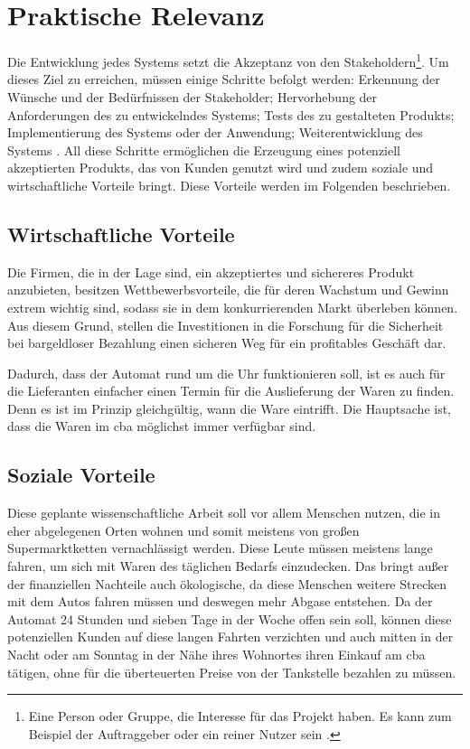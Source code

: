 \section{Praktische Relevanz}

Die Entwicklung jedes Systems setzt die Akzeptanz von den Stakeholdern\footnote{Eine Person oder Gruppe, die Interesse 
für das Projekt haben. Es kann zum Beispiel der Auftraggeber oder ein reiner Nutzer sein \cite{refip:HSSI}.}. Um dieses Ziel 
zu erreichen, müssen einige Schritte befolgt werden: Erkennung der Wünsche und der Bedürfnissen der Stakeholder; Hervorhebung 
der Anforderungen des zu entwickelndes Systems; Tests des zu gestalteten Produkts; Implementierung des Systems oder 
der Anwendung; Weiterentwicklung des Systems \cite{refbook:RECR}. All diese Schritte ermöglichen die Erzeugung eines 
potenziell akzeptierten Produkts, das von Kunden genutzt wird und zudem soziale und wirtschaftliche Vorteile bringt.
Diese Vorteile werden im Folgenden beschrieben.


\subsection{Wirtschaftliche Vorteile}

Die Firmen, die in der Lage sind, ein akzeptiertes und sichereres Produkt anzubieten, besitzen Wettbewerbsvorteile, 
die für deren Wachstum und Gewinn extrem wichtig sind, sodass sie in dem konkurrierenden Markt überleben können. Aus 
diesem Grund, stellen die Investitionen in die Forschung für die Sicherheit bei bargeldloser Bezahlung einen sicheren 
Weg für ein profitables Geschäft dar.


Dadurch, dass der Automat rund um die Uhr funktionieren soll, ist es auch für die Lieferanten einfacher einen Termin 
für die Auslieferung der Waren zu finden. Denn es ist im Prinzip gleichgültig, wann die Ware eintrifft. Die Hauptsache 
ist, dass die Waren im \acrshort{cba} möglichst immer verfügbar sind. 


\subsection{Soziale Vorteile}

Diese geplante wissenschaftliche Arbeit soll vor allem Menschen nutzen, die in eher abgelegenen Orten wohnen und somit 
meistens von großen Supermarktketten vernachlässigt werden. Diese Leute müssen meistens lange fahren, um sich mit
Waren des täglichen Bedarfs einzudecken. Das bringt außer der finanziellen Nachteile auch ökologische, da diese Menschen 
weitere Strecken mit dem Autos fahren müssen und deswegen mehr Abgase entstehen. Da der Automat 24 Stunden und sieben Tage 
in der Woche offen sein soll, können diese potenziellen Kunden auf diese langen Fahrten verzichten und auch mitten in 
der Nacht oder am Sonntag in der Nähe ihres Wohnortes ihren Einkauf am \acrshort{cba} tätigen, ohne für die überteuerten
Preise von der Tankstelle bezahlen zu müssen. 

